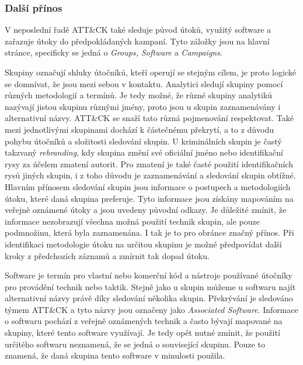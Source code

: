 \subsubsection{Další přínos}
V neposlední řadě ATT\&CK také sleduje původ útoků, využitý software a zařazuje útoky do předpokládaných kampaní.
Tyto záložky jsou na hlavní stránce, specificky se jedná o \textit{Groups, Software} a \textit{Campaigns}.

Skupiny označují shluky útočníků, kteří operují se stejným cílem, je proto logické se domnívat, že jsou mezi sebou v kontaktu.
Analytici sledují skupiny pomocí různých  metodologií a termínů.
Je tedy možné, že různé skupiny analytiků nazývají jistou skupinu různými jmény, proto jsou u skupin zaznamenávány i alternativní názvy.
ATT\&CK se snaží tato různá pojmenování respektovat.
Také mezi jednotlivými skupinami dochází k částečnému překrytí, a to z důvodu pohybu útočníků a složitosti sledování skupin.
U kriminálních skupin je častý takzvaný \textit{rebranding}, kdy skupina změní své oficiální jméno nebo identifikační rysy za účelem zmatení autorit.
Pro zmatení je také časté použití identifikačních rysů jiných skupin, i z toho důvodu je zaznamenávání a sledování skupin obtížné.
Hlavním přínosem sledování skupin jsou informace o postupech a metodologiích útoku, které daná skupina preferuje.
Tyto informace jsou získány mapováním na veřejně oznámené útoky a jsou uvedeny původní odkazy.
Je důležité zmínit, že informace nezobrazují všechna možná použití technik skupin, ale pouze podmnožinu, která byla zaznamenána.
I tak je to pro obránce značný přínos.
Při identifikaci metodologie útoku na určitou skupinu je možné předpovídat další kroky z předchozích záznamů a zmírnit tak dopad útoku.\cite{Mitre_groups}


Software je termín pro vlastní nebo komerční kód a nástroje používané útočníky pro provádění technik nebo taktik.
Stejně jako u skupin můžeme u softwaru najít alternativní názvy právě díky sledování několika skupin.
Překrývání je sledováno týmem ATT\&CK a tyto názvy jsou označeny jako \textit{Associated Software}.
Informace o softwaru pochází z veřejně oznámených technik a často bývají mapované na skupiny, které tento software využívají.
Je tedy opět nutné zmínit, že použití určitého softwaru neznamená, že se jedná o související skupinu.
Pouze to znamená, že daná skupina tento software v minulosti použila.\cite{Mitre_software}


